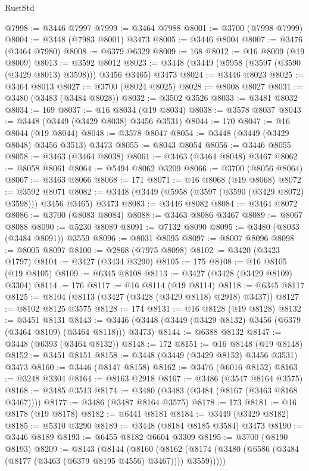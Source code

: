 \begin{lexlean}{RustStd}
\begin{coremodule}
{\begin{coremodule}
{{{{{{{{{{{{{{{{{{{{{{{{{{{{{{{{{{{{{{{{{{{{{{{{{{{{{{{{{{{{{{{{{{{{{{{{{{{{{{{{{{{{{@7998 := @3446 @7997
@7999 := @3464 @7988
@8001 := @3700 (@7998 @7999)
@8004 := @3448 (@7983 @8001) @3473
@8005 := @3446 @8004
@8007 := @3476 (@3464 @7980)
@8008 := @6379 @6329
@8009 := 168
@8012 := @16 @8009 (@19 @8009)
@8013 := @3592 @8012
@8023 := @3448 (@3449 (@5958 (@3597 (@3590 (@3429 @8013) @3598))) @3456 @3465) @3473
@8024 := @3446 @8023
@8025 := @3464 @8013
@8027 := @3700 (@8024 @8025)
@8028 := @8008 @8027
@8031 := @3480 (@3483 (@3484 @8028))
@8032 := @3502 @3526
@8033 := @3481 @8032
@8034 := 169
@8037 := @16 @8034 (@19 @8034)
@8038 := @3578 @8037
@8043 := @3448 (@3449 (@3429 @8038) @3456 @3531)
@8044 := 170
@8047 := @16 @8044 (@19 @8044)
@8048 := @3578 @8047
@8054 := @3448 (@3449 (@3429 @8048) @3456 @3513) @3473
@8055 := @8043 @8054
@8056 := @3446 @8055
@8058 := @3463 (@3464 @8038)
@8061 := @3463 (@3464 @8048) @3467
@8062 := @8058 @8061
@8064 := @5494 @8062 @3209
@8066 := @3700 (@8056 @8064)
@8067 := @3463 @8066
@8068 := 171
@8071 := @16 @8068 (@19 @8068)
@8072 := @3592 @8071
@8082 := @3448 (@3449 (@5958 (@3597 (@3590 (@3429 @8072) @3598))) @3456 @3465) @3473
@8083 := @3446 @8082
@8084 := @3464 @8072
@8086 := @3700 (@8083 @8084)
@8088 := @3463 @8086 @3467
@8089 := @8067 @8088
@8090 := @5230 @8089
@8091 := @7132 @8090
@8095 := @3480 (@8033 (@3484 @8091)) @3559
@8096 := @8031 @8095
@8097 := @8007 @8096
@8098 := @8005 @8097
@8100 := @2868 (@7975 @8098)
@8102 := @3420 (@3423 @1797)
@8104 := @3427 (@3434 @3290)
@8105 := 175
@8108 := @16 @8105 (@19 @8105)
@8109 := @6345 @8108
@8113 := @3427 (@3428 (@3429 @8109) @3304)
@8114 := 176
@8117 := @16 @8114 (@19 @8114)
@8118 := @6345 @8117
@8125 := @8104 (@8113 (@3427 (@3428 (@3429 @8118) @2918) @3437))
@8127 := @8102 @8125 @3575
@8128 := 174
@8131 := @16 @8128 (@19 @8128)
@8132 := @3451 @8131
@8143 := @3446 (@3448 (@3449 (@3429 @8132) @3456 (@6379 (@3464 @8109) (@3464 @8118))) @3473)
@8144 := @6388 @8132
@8147 := @3448 (@6393 (@3464 @8132))
@8148 := 172
@8151 := @16 @8148 (@19 @8148)
@8152 := @3451 @8151
@8158 := @3448 (@3449 (@3429 @8152) @3456 @3531) @3473
@8160 := @3446 (@8147 @8158)
@8162 := @3476 (@6016 @8152)
@8163 := @3248 @3304
@8164 := @8163 @2918
@8167 := @3486 (@3547 @8164 @3575)
@8168 := @3485 @3513
@8174 := @3480 (@3483 (@3484 (@8167 (@3463 @8168 @3467))))
@8177 := @3486 (@3487 @8164 @3575)
@8178 := 173
@8181 := @16 @8178 (@19 @8178)
@8182 := @6441 @8181
@8184 := @3449 (@3429 @8182)
@8185 := @5310 @3290
@8189 := @3448 (@8184 @8185 @3584) @3473
@8190 := @3446 @8189
@8193 := @6455 @8182 @6604 @3309
@8195 := @3700 (@8190 @8193)
@8209 := @8143
    (@8144
      (@8160
        (@8162 (@8174 (@3480 (@6586 (@3484 (@8177 (@3463 (@6379 @8195 @4556) @3467)))) @3559)))))
}}}}}}}}}}}}}}}}}}}}}}}}}}}}}}}}}}}}}}}}}}}}}}}}}}}}}}}}}}}}}}}}}}}}}}}}}}}}}}}}}}}}}
\end{coremodule}}
\end{coremodule}
\end{lexlean}
